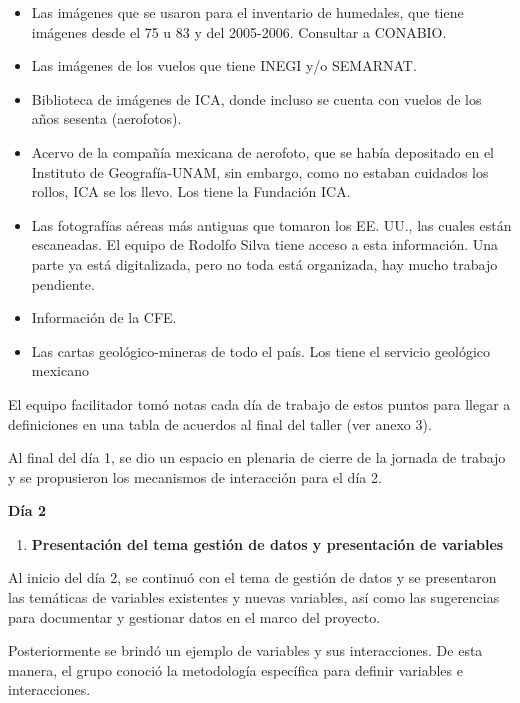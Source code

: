 \documentclass[
  letterpaper,
  DIV=11,
  numbers=noendperiod]{scrreprt}
\providecommand{\tightlist}{%
  \setlength{\itemsep}{0pt}\setlength{\parskip}{0pt}}\usepackage{longtable,booktabs,array}
\begin{document}
\begin{itemize}
\item
  Las imágenes que se usaron para el inventario de humedales, que tiene
  imágenes desde el 75 u 83 y del 2005-2006. Consultar a CONABIO.
\item
  Las imágenes de los vuelos que tiene INEGI y/o SEMARNAT.
\item
  Biblioteca de imágenes de ICA, donde incluso se cuenta con vuelos de
  los años sesenta (aerofotos).
\item
  Acervo de la compañía mexicana de aerofoto, que se había depositado en
  el Instituto de Geografía-UNAM, sin embargo, como no estaban cuidados
  los rollos, ICA se los llevo. Los tiene la Fundación ICA.
\item
  Las fotografías aéreas más antiguas que tomaron los EE. UU., las
  cuales están escaneadas. El equipo de Rodolfo Silva tiene acceso a
  esta información. Una parte ya está digitalizada, pero no toda está
  organizada, hay mucho trabajo pendiente.
\item
  Información de la CFE.
\item
  Las cartas geológico-mineras de todo el país. Los tiene el servicio
  geológico mexicano
\end{itemize}

El equipo facilitador tomó notas cada día de trabajo de estos puntos
para llegar a definiciones en una tabla de acuerdos al final del taller
(ver anexo 3).

Al final del día 1, se dio un espacio en plenaria de cierre de la
jornada de trabajo y se propusieron los mecanismos de interacción para
el día 2.

\textbf{Día 2}

\begin{enumerate}
\def\labelenumi{\arabic{enumi}.}
\setcounter{enumi}{4}
\tightlist
\item
  \textbf{Presentación del tema gestión de datos y presentación de
  variables}
\end{enumerate}

Al inicio del día 2, se continuó con el tema de gestión de datos y se
presentaron las temáticas de variables existentes y nuevas variables,
así como las sugerencias para documentar y gestionar datos en el marco
del proyecto.

Posteriormente se brindó un ejemplo de variables y sus interacciones. De
esta manera, el grupo conoció la metodología específica para definir
variables e interacciones.
\end{document}
